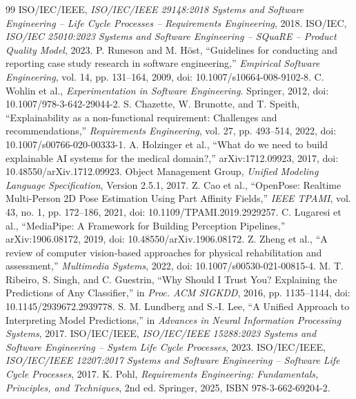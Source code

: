 \documentclass[12pt,a4paper]{article}
\begin{document}
\clearpage
\begin{thebibliography}{99}
 ISO/IEC/IEEE, \emph{ISO/IEC/IEEE 29148:2018 Systems and Software Engineering -- Life Cycle Processes -- Requirements Engineering}, 2018.
 ISO/IEC, \emph{ISO/IEC 25010:2023 Systems and Software Engineering -- SQuaRE -- Product Quality Model}, 2023.
 P. Runeson and M. Höst, ``Guidelines for conducting and reporting case study research in software engineering,'' \emph{Empirical Software Engineering}, vol. 14, pp. 131--164, 2009, doi: 10.1007/s10664-008-9102-8.
 C. Wohlin et al., \emph{Experimentation in Software Engineering}. Springer, 2012, doi: 10.1007/978-3-642-29044-2.
 S. Chazette, W. Brunotte, and T. Speith, ``Explainability as a non-functional requirement: Challenges and recommendations,'' \emph{Requirements Engineering}, vol. 27, pp. 493--514, 2022, doi: 10.1007/s00766-020-00333-1.
 A. Holzinger et al., ``What do we need to build explainable AI systems for the medical domain?,'' arXiv:1712.09923, 2017, doi: 10.48550/arXiv.1712.09923.
 Object Management Group, \emph{Unified Modeling Language Specification}, Version 2.5.1, 2017.
 Z. Cao et al., ``OpenPose: Realtime Multi-Person 2D Pose Estimation Using Part Affinity Fields,'' \emph{IEEE TPAMI}, vol. 43, no. 1, pp. 172--186, 2021, doi: 10.1109/TPAMI.2019.2929257.
 C. Lugaresi et al., ``MediaPipe: A Framework for Building Perception Pipelines,'' arXiv:1906.08172, 2019, doi: 10.48550/arXiv.1906.08172.
 Z. Zheng et al., ``A review of computer vision-based approaches for physical rehabilitation and assessment,'' \emph{Multimedia Systems}, 2022, doi: 10.1007/s00530-021-00815-4.
 M. T. Ribeiro, S. Singh, and C. Guestrin, ``Why Should I Trust You? Explaining the Predictions of Any Classifier,'' in \emph{Proc. ACM SIGKDD}, 2016, pp. 1135--1144, doi: 10.1145/2939672.2939778.
 S. M. Lundberg and S.-I. Lee, ``A Unified Approach to Interpreting Model Predictions,'' in \emph{Advances in Neural Information Processing Systems}, 2017.
 ISO/IEC/IEEE, \emph{ISO/IEC/IEEE 15288:2023 Systems and Software Engineering -- System Life Cycle Processes}, 2023.
 ISO/IEC/IEEE, \emph{ISO/IEC/IEEE 12207:2017 Systems and Software Engineering -- Software Life Cycle Processes}, 2017.
 K. Pohl, \emph{Requirements Engineering: Fundamentals, Principles, and Techniques}, 2nd ed. Springer, 2025, ISBN 978-3-662-69204-2.

\end{thebibliography}
\end{document}
